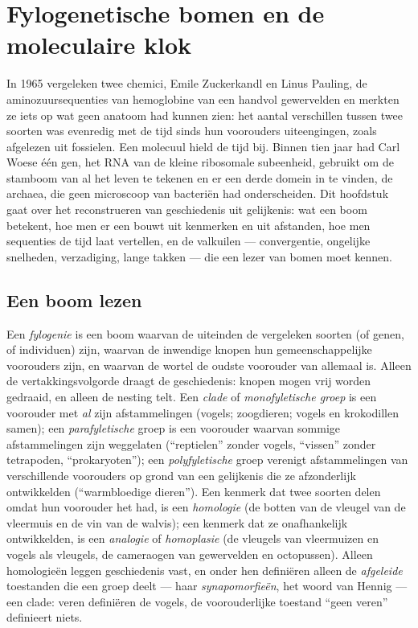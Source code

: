 \chapter{Fylogenetische bomen en de moleculaire klok}\label{ch:b2:phylogenetic-trees}

In 1965 vergeleken twee chemici, Emile Zuckerkandl en Linus Pauling, de
aminozuursequenties van hemoglobine van een handvol gewervelden en merkten ze
iets op wat geen anatoom had kunnen zien: het aantal verschillen tussen twee
soorten was evenredig met de tijd sinds hun voorouders uiteengingen, zoals
afgelezen uit fossielen. Een molecuul hield de tijd bij. Binnen tien jaar had
Carl Woese één gen, het RNA van de kleine ribosomale subeenheid, gebruikt om de
stamboom van al het leven te tekenen en er een derde domein in te vinden, de
archaea, die geen microscoop van bacteriën had onderscheiden. Dit hoofdstuk
gaat over het reconstrueren van geschiedenis uit gelijkenis: wat een boom
betekent, hoe men er een bouwt uit kenmerken en uit afstanden, hoe men
sequenties de tijd laat vertellen, en de valkuilen --- convergentie, ongelijke
snelheden, verzadiging, lange takken --- die een lezer van bomen moet kennen.

\section{Een boom lezen}

\begin{definition}\label{def:b2:phylogenetic-trees:tree}
Een \emph{fylogenie} is een boom waarvan de uiteinden de vergeleken soorten
(of genen, of individuen) zijn, waarvan de inwendige knopen hun gemeenschappelijke
voorouders zijn, en waarvan de wortel de oudste voorouder van allemaal is.
Alleen de vertakkingsvolgorde draagt de geschiedenis: knopen mogen vrij worden
gedraaid, en alleen de nesting telt. Een \emph{clade} of
\emph{monofyletische groep} is een voorouder met \emph{al} zijn
afstammelingen (vogels; zoogdieren; vogels en krokodillen samen);
een \emph{parafyletische} groep is een voorouder waarvan sommige afstammelingen
zijn weggelaten (``reptielen'' zonder vogels, ``vissen'' zonder tetrapoden,
``prokaryoten''); een \emph{polyfyletische} groep verenigt afstammelingen van
verschillende voorouders op grond van een gelijkenis die ze afzonderlijk
ontwikkelden (``warmbloedige dieren''). Een kenmerk dat twee soorten delen
omdat hun voorouder het had, is een \emph{homologie} (de botten van
de vleugel van de vleermuis en de vin van de walvis); een kenmerk dat ze
onafhankelijk ontwikkelden, is een \emph{analogie} of \emph{homoplasie} (de
vleugels van vleermuizen en vogels als vleugels, de cameraogen van gewervelden
en octopussen). Alleen homologieën leggen geschiedenis vast, en onder hen
definiëren alleen de \emph{afgeleide} toestanden die een groep deelt --- haar
\emph{synapomorfieën}, het woord van Hennig --- een clade: veren
definiëren de vogels, de voorouderlijke toestand ``geen veren'' definieert niets.
\end{definition}

